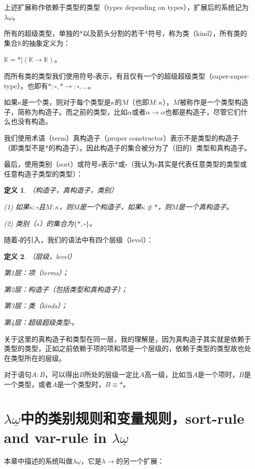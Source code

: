 \documentclass[UTF8]{article}
\newtheorem{thm}{定义}[section]
\begin{document}
		上述扩展称作依赖于类型的类型（types depending on types），扩展后的系统记为$\lambda{\underline{\omega}}$。
			
		所有的超级类型，单独的*以及箭头分割的若干*符号，称为类（kind），所有类的集合$\mathbb{K}$的抽象定义为：
		
		$\mathbb{K}=*|(\mathbb{K}\rightarrow\mathbb{K})$。
		
		而所有类的类型我们使用符号$\square$表示，有且仅有一个的超级超级类型（super-super-type）。也即有$*:\square,*\rightarrow:\square,...$。
		
		如果$\kappa$是一个类，则对于每个类型是$\kappa$的$M$（也即$M:\kappa$），$M$被称作是一个类型构造子，简称为构造子。而之前的类型，比如$\alpha$或者$\alpha\rightarrow\alpha$也都是构造子，尽管它们什么也没有构造。
		
		我们使用术语（term）真构造子（proper constructor）表示不是类型的构造子（即类型不是*的构造子）。因此构造子的集合被分为了（旧的）类型和真构造子。
		
		最后，使用类别（sort）或符号$s$表示*或$\square$（我认为s其实是代表任意类型的类型或任意构造子类型的类型）：
		
		\begin{thm}（构造子，真构造子，类别）
			
			(1) 如果$\kappa:\square$且$M:\kappa$，则$M$是一个构造子，如果$\kappa\not\equiv*$，则$M$是一个真构造子。
			
			(2) 类别（$s$）的集合为$\{*,\square\}$。
		\end{thm}
	
		随着$\square$的引入，我们的语法中有四个层级（level）：
		
		\begin{thm}（层级，level）
			
			第1层：项（terms）；
			
			第2层：构造子（包括类型和真构造子）；
			
			第3层：类（kinds）；
			
			第4层：超级超级类型$\square$。
		\end{thm}
	
		关于这里的真构造子和类型在同一层，我的理解是，因为真构造子其实就是依赖于类型的类型，正如之前依赖于项的项和项是一个层级的，依赖于类型的类型故也处在类型所在的层级。
	
		对于语句$A:B$，可以得出$B$所处的层级一定比$A$高一级，比如当$A$是一个项时，$B$是一个类型，或者$A$是一个类型时，$B\equiv*$。
		
	\section{$\lambda{\underline{\omega}}$中的类别规则和变量规则，sort-rule and var-rule in $\lambda{\underline{\omega}}$}
		\noindent
		本章中描述的系统叫做$\lambda{\underline{\omega}}$，它是$\lambda{\rightarrow}$的另一个扩展：
		
\end{document}
